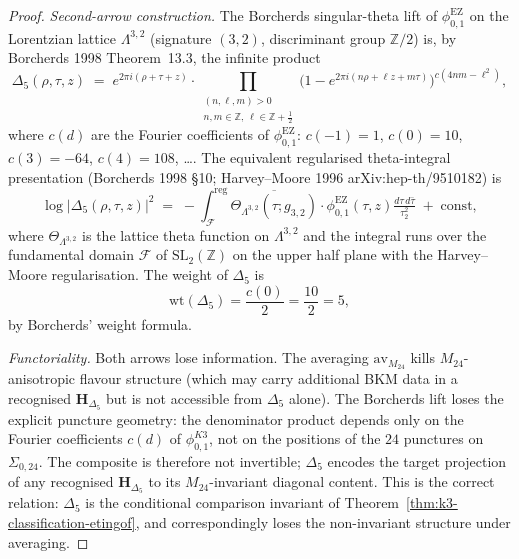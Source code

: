 \begin{proof}
\emph{Second-arrow construction.} The Borcherds singular-theta lift of
$\phi_{0,1}^{\mathrm{EZ}}$ on the Lorentzian lattice $\Lambda^{3,2}$ (signature
$(3,2)$, discriminant group $\mathbb{Z}/2$) is, by Borcherds 1998
Theorem~13.3, the infinite product
\begin{equation}
 \Delta_5(\rho,\tau,z)
 \;=\;
 e^{2\pi i(\rho+\tau+z)}
 \cdot \prod_{\substack{(n,\ell,m)>0\\
 n,m\in\mathbb{Z},\,\ell\in\mathbb{Z}+\tfrac{1}{2}}}
 \bigl(1 - e^{2\pi i(n\rho + \ell z + m\tau)}\bigr)^{c(4nm - \ell^2)},
 \label{eq:delta5-borcherds}
\end{equation}
where $c(d)$ are the Fourier coefficients of $\phi_{0,1}^{\mathrm{EZ}}$:
$c(-1) = 1$, $c(0) = 10$, $c(3) = -64$, $c(4) = 108$, \ldots.
The equivalent regularised
theta-integral presentation (Borcherds 1998 \S10; Harvey--Moore 1996
arXiv:hep-th/9510182) is
\begin{equation}
 \log|\Delta_5(\rho,\tau,z)|^2
 \;=\;
 -\!\int_{\mathcal{F}}^{\mathrm{reg}}
 \overline{\Theta_{\Lambda^{3,2}}(\tau;g_{3,2})}\cdot\phi_{0,1}^{\mathrm{EZ}}(\tau,z)
 \tfrac{d\tau\,d\bar\tau}{\tau_2^2}
 \;+\;\mathrm{const},
 \label{eq:delta5-borcherds-integral}
\end{equation}
where $\Theta_{\Lambda^{3,2}}$ is the lattice theta function on
$\Lambda^{3,2}$ and the integral runs over the fundamental domain
$\mathcal{F}$ of $\mathrm{SL}_2(\mathbb{Z})$ on the upper half plane with the
Harvey--Moore regularisation. The weight of $\Delta_5$ is
\[
 \mathrm{wt}(\Delta_5)=\frac{c(0)}{2}=\frac{10}{2}=5,
\]
by Borcherds' weight formula.

\emph{Functoriality.} Both arrows lose information. The averaging
$\mathrm{av}_{M_{24}}$ kills $M_{24}$-anisotropic flavour structure (which
may carry additional BKM data in a recognised $\mathbf{H}_{\Delta_5}$ but is
not accessible from $\Delta_5$ alone). The Borcherds lift loses the explicit
puncture geometry: the denominator product depends only on the Fourier
coefficients $c(d)$ of $\phi_{0,1}^{K3}$, not on the positions of the $24$
punctures on $\Sigma_{0,24}$. The composite is therefore not invertible;
$\Delta_5$ encodes the target projection of any recognised
$\mathbf{H}_{\Delta_5}$ to its $M_{24}$-invariant diagonal content. This is
the correct relation: $\Delta_5$ is the conditional comparison invariant of
Theorem~\ref{thm:k3-classification-etingof}, and correspondingly loses the
non-invariant structure under averaging.
\end{proof}

